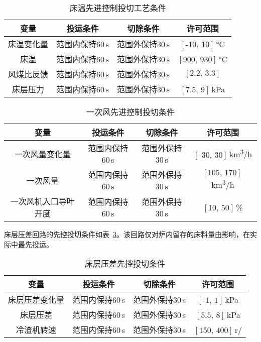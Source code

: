 \begingroup
\renewcommand*{\arraystretch}{1.67}
\begin{table}[!h]
\small
\centering
\caption[床温先进控制投切工艺条件]{床温先进控制投切工艺条件} \label{tab:bed_tem_req}
\begin{tabular}{cccc}
\hline\hline
变量	&投运条件	&切除条件	&许可范围\\
\hline
床温变化量	&范围内保持60$\,$\si{s}	&范围外保持30$\,$\si{s}	&$[\textrm{-10},\,\textrm{10}]\,$\si{\degreeCelsius}\\
床温	&范围内保持60$\,$\si{s}	&范围外保持30$\,$\si{s}	&$[\textrm{900},\,\textrm{930}]\,$\si{\degreeCelsius}\\
风煤比反馈	&范围内保持60$\,$\si{s}	&范围外保持30$\,$\si{s}	&$[\textrm{2.2},\,\textrm{3.3}]$\\
床层压力	&范围内保持60$\,$\si{s}	&范围外保持30$\,$\si{s}&	$[\textrm{7.5},\,\textrm{9}]\,$\si{\kilo\pascal}\\
\hline\hline
\end{tabular}
\end{table}
\endgroup


\begingroup
\renewcommand*{\arraystretch}{1.67}
\begin{table}[!h]
\small
\centering
\caption[一次风先进控制投切条件]{一次风先进控制投切条件} \label{tab:flow_req}
\begin{tabular}{cccc}
\hline\hline
变量	&投运条件	&切除条件	&许可范围\\
\hline
一次风量变化量	&范围内保持60$\,$\si{s}	&范围外保持30$\,$\si{s}	&$[\textrm{-30},\,\textrm{30}]\,$\si[per-mode=symbol]{\kilo\meter^{3}\per\hour}\\
一次风量	&范围内保持60$\,$\si{s}	&范围外保持30$\,$\si{s}	&$[\textrm{105},\,\textrm{170}]\,$\si[per-mode=symbol]{\kilo\meter^{3}\per\hour}\\
一次风机入口导叶开度	&范围内保持60$\,$\si{s}	&范围外保持30$\,$\si{s}	&$[\textrm{10},\,\textrm{50}]\,$\si{\percent}\\
\hline\hline
\end{tabular}
\end{table}
\endgroup


床层压差回路的先控投切条件如表~\ref{tab:bed_pre_req}。该回路仅对炉内留存的床料量由影响，在实际中最先投运。

\begingroup
\renewcommand*{\arraystretch}{1.67}
\begin{table}[!h]
\small
\centering
\caption[床层压差先控投切条件]{床层压差先控投切条件} \label{tab:bed_pre_req}
\begin{tabular}{cccc}
\hline\hline
变量	&投运条件	&切除条件	&许可范围\\
\hline
床层压差变化量	&范围内保持60$\,$\si{s}&	范围外保持30$\,$\si{s}&	$[\textrm{-1},\,\textrm{1}]\,$\si{\kilo\pascal}\\
床层压差	&范围内保持60$\,$\si{s}	&范围外保持30$\,$\si{s}	&$[\textrm{5.5},\,\textrm{8}]\,$\si{\kilo\pascal}\\
冷渣机转速	&范围内保持60$\,$\si{s}	&范围外保持30$\,$\si{s}	&$[\textrm{150},\,\textrm{400}]\,$\si{r/\min}\\
\hline\hline
\end{tabular}
\end{table}
\endgroup

